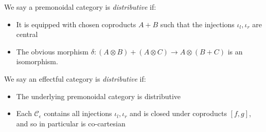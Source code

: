 \documentclass[acmsmall,screen,review]{acmart}
\newcommand{\mc}[1]{\ensuremath{\mathcal{#1}}}
\begin{document}
\begin{definition}
  We say a premonoidal category is \emph{distributive} if:
  \begin{itemize}
    \item It is equipped with chosen coproducts $A + B$ such that the injections $\iota_l, \iota_r$
    are central
    \item The obvious morphism $\delta : (A \otimes B) + (A \otimes C) \to A \otimes (B + C)$ is an
    isomorphism.
  \end{itemize}
\end{definition}

\begin{definition}
  We say an effectful category is \emph{distributive} if:
  \begin{itemize}
    \item The underlying premonoidal category is distributive
    \item Each $\mc{C}_\epsilon$ contains all injections $\iota_l, \iota_r$ and is closed under
    coproducts $[f, g]$, and so in particular is co-cartesian
  \end{itemize}
\end{definition}
\end{document}
